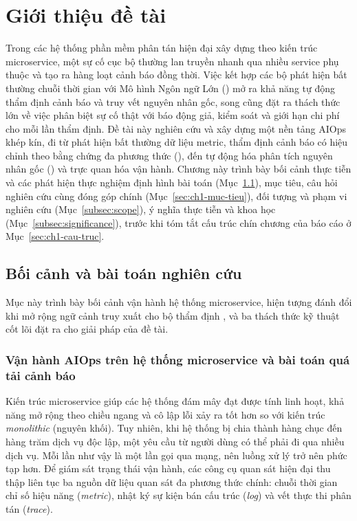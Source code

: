 \section{Giới thiệu đề tài}
\label{ch:mo-dau}

Trong các hệ thống phần mềm phân tán hiện đại xây dựng theo kiến trúc microservice, một sự cố cục bộ thường lan truyền nhanh qua nhiều service phụ thuộc và tạo ra hàng loạt cảnh báo đồng thời. Việc kết hợp các bộ phát hiện bất thường chuỗi thời gian với Mô hình Ngôn ngữ Lớn () mở ra khả năng tự động thẩm định cảnh báo và truy vết nguyên nhân gốc, song cũng đặt ra thách thức lớn về việc phân biệt sự cố thật với báo động giả, kiểm soát  và giới hạn chi phí cho mỗi lần thẩm định. Đề tài này nghiên cứu và xây dựng một nền tảng AIOps khép kín, đi từ phát hiện bất thường dữ liệu metric, thẩm định cảnh báo có hiệu chỉnh theo bằng chứng đa phương thức (\CTAV{}), đến tự động hóa phân tích nguyên nhân gốc () và trực quan hóa vận hành. Chương này trình bày bối cảnh thực tiễn và các phát hiện thực nghiệm định hình bài toán (Mục~\ref{sec:ch1-boi-canh}), mục tiêu, câu hỏi nghiên cứu cùng đóng góp chính (Mục~\ref{sec:ch1-muc-tieu}), đối tượng và phạm vi nghiên cứu (Mục~\ref{subsec:scope}), ý nghĩa thực tiễn và khoa học (Mục~\ref{subsec:significance}), trước khi tóm tắt cấu trúc chín chương của báo cáo ở Mục~\ref{sec:ch1-cau-truc}.

\subsection{Bối cảnh và bài toán nghiên cứu}
\label{sec:ch1-boi-canh}

Mục này trình bày bối cảnh vận hành hệ thống microservice, hiện tượng đánh đổi khi mở rộng ngữ cảnh truy xuất cho bộ thẩm định , và ba thách thức kỹ thuật cốt lõi đặt ra cho giải pháp của đề tài.

\subsubsection{Vận hành AIOps trên hệ thống microservice và bài toán quá tải cảnh báo}
\label{sec:ch1-qua-tai}

Kiến trúc microservice giúp các hệ thống đám mây đạt được tính linh hoạt, khả năng mở rộng theo chiều ngang và cô lập lỗi xảy ra tốt hơn so với kiến trúc \textit{monolithic} (nguyên khối). Tuy nhiên, khi hệ thống bị chia thành hàng chục đến hàng trăm dịch vụ độc lập, một yêu cầu từ người dùng có thể phải đi qua nhiều dịch vụ. Mỗi lần như vậy là một lần gọi qua mạng, nên luồng xử lý trở nên phức tạp hơn. Để giám sát trạng thái vận hành, các công cụ quan sát hiện đại thu thập liên tục ba nguồn dữ liệu quan sát đa phương thức chính: chuỗi thời gian chỉ số hiệu năng (\textit{metric}), nhật ký sự kiện bán cấu trúc (\textit{log}) và vết thực thi phân tán (\textit{trace}).

